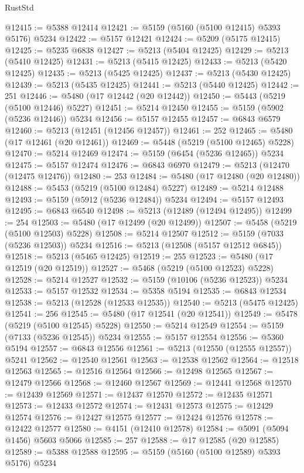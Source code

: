 \begin{lexlean}{RustStd}
\begin{coremodule}
@12415 := @5388 @12414
@12421 := @5159 (@5160 (@5100 @12415) @5393 @5176) @5234
@12422 := @5157 @12421
@12424 := @5209 (@5175 @12415)
@12425 := @5235 @6838
@12427 := @5213 (@5404 @12425)
@12429 := @5213 (@5410 @12425)
@12431 := @5213 (@5415 @12425)
@12433 := @5213 (@5420 @12425)
@12435 := @5213 (@5425 @12425)
@12437 := @5213 (@5430 @12425)
@12439 := @5213 (@5435 @12425)
@12441 := @5213 (@5440 @12425)
@12442 := 251
@12446 := @5480 (@17 @12442 (@20 @12442))
@12450 := @5443 (@5219 (@5100 @12446) @5227)
@12451 := @5214 @12450
@12455 := @5159 (@5902 (@5236 @12446)) @5234
@12456 := @5157 @12455
@12457 := @6843 @6579
@12460 := @5213 (@12451 (@12456 @12457))
@12461 := 252
@12465 := @5480 (@17 @12461 (@20 @12461))
@12469 := @5448 (@5219 (@5100 @12465) @5228)
@12470 := @5214 @12469
@12474 := @5159 (@6454 (@5236 @12465)) @5234
@12475 := @5157 @12474
@12476 := @6843 @6970
@12479 := @5213 (@12470 (@12475 @12476))
@12480 := 253
@12484 := @5480 (@17 @12480 (@20 @12480))
@12488 := @5453 (@5219 (@5100 @12484) @5227)
@12489 := @5214 @12488
@12493 := @5159 (@5912 (@5236 @12484)) @5234
@12494 := @5157 @12493
@12495 := @6843 @6540
@12498 := @5213 (@12489 (@12494 @12495))
@12499 := 254
@12503 := @5480 (@17 @12499 (@20 @12499))
@12507 := @5458 (@5219 (@5100 @12503) @5228)
@12508 := @5214 @12507
@12512 := @5159 (@7033 (@5236 @12503)) @5234
@12516 := @5213 (@12508 (@5157 @12512 @6845))
@12518 := @5213 (@5465 @12425)
@12519 := 255
@12523 := @5480 (@17 @12519 (@20 @12519))
@12527 := @5468 (@5219 (@5100 @12523) @5228)
@12528 := @5214 @12527
@12532 := @5159 (@10106 (@5236 @12523)) @5234
@12533 := @5157 @12532
@12534 := @5358 @5194
@12535 := @6843 @12534
@12538 := @5213 (@12528 (@12533 @12535))
@12540 := @5213 (@5475 @12425)
@12541 := 256
@12545 := @5480 (@17 @12541 (@20 @12541))
@12549 := @5478 (@5219 (@5100 @12545) @5228)
@12550 := @5214 @12549
@12554 := @5159 (@7133 (@5236 @12545)) @5234
@12555 := @5157 @12554
@12556 := @5360 @5194
@12557 := @6843 @12556
@12561 := @5213 (@12550 (@12555 @12557)) @5241
@12562 := @12540 @12561
@12563 := @12538 @12562
@12564 := @12518 @12563
@12565 := @12516 @12564
@12566 := @12498 @12565
@12567 := @12479 @12566
@12568 := @12460 @12567
@12569 := @12441 @12568
@12570 := @12439 @12569
@12571 := @12437 @12570
@12572 := @12435 @12571
@12573 := @12433 @12572
@12574 := @12431 @12573
@12575 := @12429 @12574
@12576 := @12427 @12575
@12577 := @12424 @12576
@12578 := @12422 @12577
@12580 := @4151 (@12410 @12578)
@12584 := @5091 (@5094 @1456) @5603 @5066
@12585 := 257
@12588 := @17 @12585 (@20 @12585)
@12589 := @5388 @12588
@12595 := @5159 (@5160 (@5100 @12589) @5393 @5176) @5234

\end{coremodule}
\end{lexlean}
